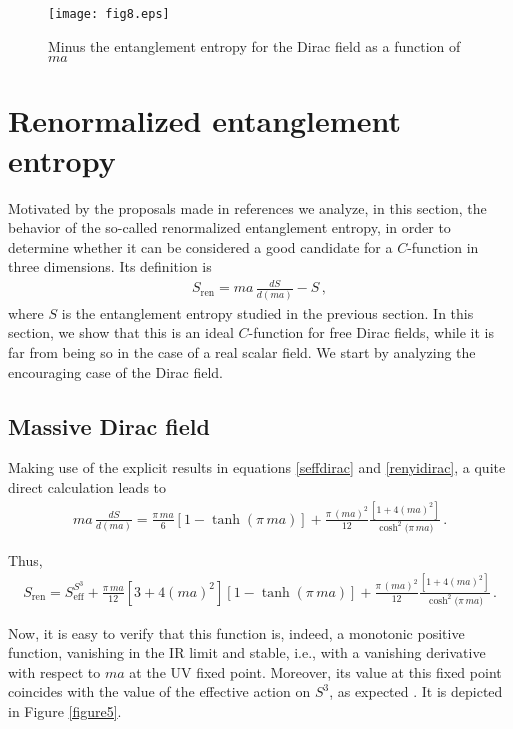 \documentclass[12pt,a4paper]{article}
\newcommand{\beq}{\begin{eqnarray}}
\newcommand{\eeq}{\end{eqnarray}}
\numberwithin{equation}{section}
\begin{document}
\begin{figure}[h]
\centering
\texttt{[image: fig8.eps]}
\caption{\small Minus the entanglement entropy for the Dirac field as a function of $ma$}
\label{figure4}
\end{figure}

\section{Renormalized entanglement entropy}\label{sect4}

Motivated by the proposals made in references \cite{casini,liu} we analyze, in this section, the behavior of the so-called renormalized entanglement entropy, in order to determine whether it can be considered a good candidate for a $\textit{C}$-function in three dimensions. Its definition is
\beq
S_{\mathrm{ren}}=ma\,\frac{d S}{d(ma)}-S\,,
\eeq
where $S$ is the entanglement entropy studied in the previous section. In this section, we show that this is an ideal $\textit{C}$-function for free Dirac fields, while it is far from being so in the case of a real scalar field. We start by analyzing the encouraging case of the Dirac field.

\subsection{Massive Dirac field}

Making use of the explicit results in equations \eqref{seffdirac} and \eqref{renyidirac}, a quite direct calculation leads to
\beq
ma\,\frac{d S}{d(ma)}=\frac{\pi\,ma}{6}\left[1-\tanh{(\pi\,ma)}\right]+\frac{\pi\,(ma)^2}{12}\frac{\left[1+4(ma)^2\right]}{\cosh^2{(\pi\,ma})}\,.
\eeq

Thus,
\beq
S_{\mathrm{ren}}=S_{\mathrm{eff}}^{S^3}+\frac{\pi\,ma}{12}\left[3+4(ma)^2\right]\left[1-\tanh{(\pi\,ma)}\right]+\frac{\pi\,(ma)^2}{12}\frac{\left[1+4(ma)^2\right]}{\cosh^2{(\pi\,ma})}\,.
\eeq

Now, it is easy to verify that this function is, indeed, a monotonic positive function, vanishing in the IR limit and stable, i.e., with a vanishing derivative with respect to $ma$ at the UV fixed point. Moreover, its value at this fixed point coincides with the value of the effective action on $S^3$, as expected \cite{casini}. It is depicted in Figure \ref{figure5}.
\end{document}
